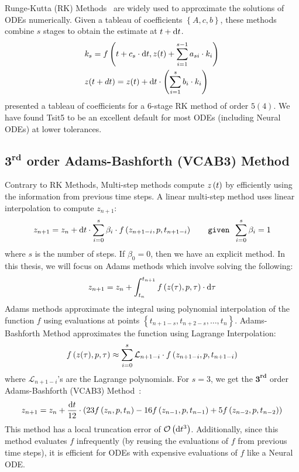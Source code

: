 Runge-Kutta (RK) Methods~\citep{runge1895numerische, kutta1901beitrag} are widely used to approximate the solutions of ODEs numerically. Given a tableau of coefficients $\left\{A, c, b\right\}$, these methods combine $s$ stages to obtain the estimate at $t + \mathrm{d}t$.
%
\begin{align}
   & k_s = f\left(t + c_s \cdot \mathrm{d}t, z(t) + \sum_{i = 1}^{s - 1} a_{si} \cdot k_i\right)                     \\
   & z(t + dt) = z(t) + \mathrm{d}t \cdot \left( \sum_{i = 1}^s b_i \cdot k_i \right) \label{eq:rk_method_tsit5}
\end{align}
%
\citet{tsitouras2011runge} presented a tableau of coefficients for a 6-stage RK method of order $5 (4)$. We have found Tsit5 to be an excellent default for most ODEs (including Neural ODEs) at lower tolerances.

\subsection{$\mathbf{3^{rd}}$ order Adams-Bashforth (VCAB3) Method}
\label{subsec:vcab3_method}

Contrary to RK Methods, Multi-step methods compute $z\left(t\right)$ by efficiently using the information from previous time steps. A linear multi-step method uses linear interpolation to compute $z_{n + 1}$:
%
\begin{equation}
  z_{n + 1} = z_n + \mathrm{d}t \cdot \sum_{i = 0}^{s} \beta_i \cdot f\left(z_{n + 1 - i}, p, t_{n + 1 - i}\right) \qquad \texttt{given } \sum_{i = 0}^s \beta_i = 1
\end{equation}
%
where $s$ is the number of steps. If $\beta_0 = 0$, then we have an explicit method. In this thesis, we will focus on Adams methods which involve solving the following:
%
\begin{equation}
  z_{n + 1} = z_n + \int_{t_n}^{t_{n + 1}} f\left(z(\tau), p, \tau\right) \cdot \mathrm{d}\tau
\end{equation}
%
Adams methods approximate the integral using polynomial interpolation of the function $f$ using evaluations at points $\left\{ t_{n + 1 - s}, t_{n + 2 - s}, \dots, t_{n} \right\}$. Adams-Bashforth Method approximates the function using Lagrange Interpolation:
%
\begin{equation}
  f\left(z(\tau), p, \tau\right) \approx \sum_{i = 0}^{s} \mathcal{L}_{n + 1 - i} \cdot f\left(z_{n + 1 - i}, p, t_{n + 1 - i}\right)
\end{equation}
%
where $\mathcal{L}_{n + 1 - i}$'s are the Lagrange polynomials. For $s = 3$, we get the $\mathbf{3^{rd}}$ order Adams-Bashforth (VCAB3) Method~\citep{durran1991third}:
%
\begin{equation}
  z_{n + 1} = z_n + \frac{\mathrm{d}t}{12} \cdot \left( 23 f\left(z_n, p, t_n\right) - 16 f\left(z_{n - 1}, p, t_{n - 1}\right) + 5 f\left(z_{n - 2}, p, t_{n - 2}\right) \right)
\end{equation}
%
This method has a local truncation error of $\mathcal{O}\left(\mathrm{d}t^3\right)$. Additionally, since this method evaluates $f$ infrequently (by reusing the evaluations of $f$ from previous time steps), it is efficient for ODEs with expensive evaluations of $f$ like a Neural ODE.

